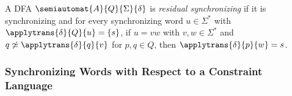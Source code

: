 A DFA $\semiautomat{A}{Q}{\Sigma}{\delta}$ %
is \emph{residual synchronizing} if it is synchronizing
and for every synchronizing word $u \in \Sigma^*$ with $\applytrans{\delta}{Q}{u} = \{s\}$,
if $u = vw$ with $v,w \in \Sigma^*$
and $q \not\simeq \applytrans{\delta}{q}{v}$ for $p, q \in Q$,
then $\applytrans{\delta}{p}{w} = s$. %
%
%















\subsubsection{Synchronizing Words with Respect to a Constraint Language}

